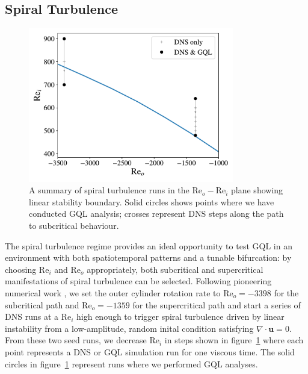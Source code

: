 \documentclass[openacc]{rstransa}%
\newcommand{\Reyn}{\mathrm{Re}}
\begin{document}
\subsection{Spiral Turbulence}
\begin{figure}
    \centering
    \includegraphics[width=0.8\textwidth]{../figs/reo_rei_lsb.pdf}
    \caption{A summary of spiral turbulence runs in the $\Reyn_o-\Reyn_i$ plane showing linear stability boundary. Solid circles shows points where we have conducted GQL analysis; crosses represent DNS steps along the path to subcritical behaviour. }
    \label{fig:LSB}
\end{figure}



The spiral turbulence regime provides an ideal opportunity to test GQL in an environment with both spatiotemporal patterns and a tunable bifurcation: by choosing $\Reyn_i$ and $\Reyn_o$ appropriately, both subcritical and supercritical manifestations of spiral turbulence can be selected.
Following pioneering numerical work \cite{2009PhRvE..79c6309M, 2009PhRvE..80d6315M}, we set the outer cylinder rotation rate to $\Reyn_o = -3398$ for the subcritical path and $\Reyn_o = -1359$ for the supercritical path and start a series of DNS runs at a $\Reyn_i$ high enough to trigger spiral turbulence driven by linear instability from a low-amplitude, random inital condition satisfying $\nabla \cdot \mathbf{u} = 0$.
From these two seed runs, we decrease $\Reyn_i$ in steps shown in figure~\ref{fig:LSB} where each point represents a DNS or GQL simulation run for one viscous time. The solid circles in figure~\ref{fig:LSB} represent runs where we performed GQL analyses. 
\end{document}
